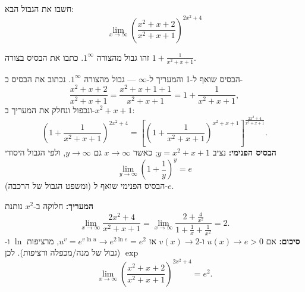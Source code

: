 
\begin{question}
חשבו את הגבול הבא:
\[
\lim_{x\to\infty}\left(\frac{x^2+x+2}{x^2+x+1}\right)^{2x^2+4}
\]
\end{question}

\begin{hint}
זהו גבול מהצורה $1^\infty$. כתבו את הבסיס בצורה $1+\frac{1}{x^2+x+1}$.
\end{hint}

\begin{solution}
הבסיס שואף ל-1 והמעריך ל-$\infty$ — גבול מהצורה $1^\infty$. נכתוב את הבסיס כ-
\[
\frac{x^2+x+2}{x^2+x+1}=\frac{x^2+x+1+1}{x^2+x+1}=1+\frac{1}{x^2+x+1},
\]
ונכפול ונחלק את המעריך ב-$x^2+x+1$:
\[
\left(1+\frac{1}{x^2+x+1}\right)^{2x^2+4}
=\left[\left(1+\frac{1}{x^2+x+1}\right)^{x^2+x+1}\right]^{\frac{2x^2+4}{x^2+x+1}} .
\]
\textbf{הבסיס הפנימי:} נציב $y=x^2+x+1$; כאשר $x\to\infty$ גם $y\to\infty$, ולפי הגבול היסודי
\[
\lim_{y\to\infty}\left(1+\frac1y\right)^y=e
\]
(ומשפט הגבול של הרכבה) הבסיס הפנימי שואף ל-$e$.

\textbf{המעריך:} חלוקה ב-$x^2$ נותנת
\[
\lim_{x\to\infty}\frac{2x^2+4}{x^2+x+1}=\lim_{x\to\infty}\frac{2+\frac4{x^2}}{1+\frac1x+\frac1{x^2}}=2 .
\]
\textbf{סיכום:} אם $u(x)\to e>0$ ו-$v(x)\to2$ אז $u^v=e^{v\ln u}\to e^{2\ln e}=e^2$, מרציפות $\ln$ ו-$\exp$ (גבול של מנה/מכפלה ורציפות). לכן
\[
\lim_{x\to\infty}\left(\frac{x^2+x+2}{x^2+x+1}\right)^{2x^2+4}=\boxed{e^2}.
\]
\end{solution}
